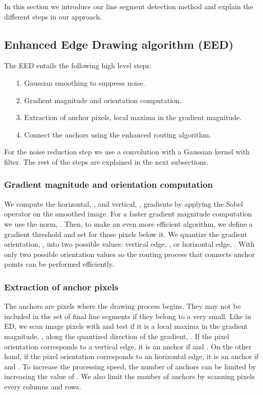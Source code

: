 \documentclass[preprint,12pt]{elsarticle}
\begin{document}
In this section we introduce our line segment detection method 
and explain the different steps in our approach. 

\subsection{Enhanced Edge Drawing algorithm (EED)}
\label{sec:enhanded-edge-drawing-algorithm}

The EED entails the following high level steps:
\begin{enumerate}
 \item[1.] Gaussian smoothing to suppress noise.
 \item[2.] Gradient magnitude and orientation computation.
 \item[3.] Extraction of anchor pixels, local maxima in the gradient magnitude.
 \item[4.] Connect the anchors using the enhanced routing algorithm. 
\end{enumerate}

For the noise reduction step we use a convolution with a  Gaussian kernel with  filter. The rest of the steps are explained in the next subsections. 

\subsubsection{Gradient magnitude and orientation computation}
\label{sec:gradient}

We compute the horizontal, , and vertical, , gradients by applying the Sobel operator on the smoothed image. 
For a faster gradient magnitude computation we use the  norm, . 
Then, to make an even more efficient algorithm, we define a gradient threshold and set  for those pixels below it. 
We quantize the gradient orientation, , into two possible values: vertical edge, , or horizontal edge, . With only two possible orientation values so the routing process that connects anchor points can be performed efficiently. 

\subsubsection{Extraction of anchor pixels}
\label{sec:anchors}

The anchors are pixels where the drawing process begins. They may not be included in the set of final line segments if they belong to a very small. 
Like in ED, we scan image pixels with  and test if it is a local maxima in the gradient magnitude, , along the quantized direction of the gradient, .
If the pixel orientation  corresponds to a vertical edge, it is an anchor if  and . On the other hand, if the pixel orientation corresponds to an horizontal edge, it is an anchor if  and . To increase the processing speed, the number of anchors can be limited by increasing the value of . 
We also limit the number of anchors by scanning pixels every  columns and rows. 
\end{document}
